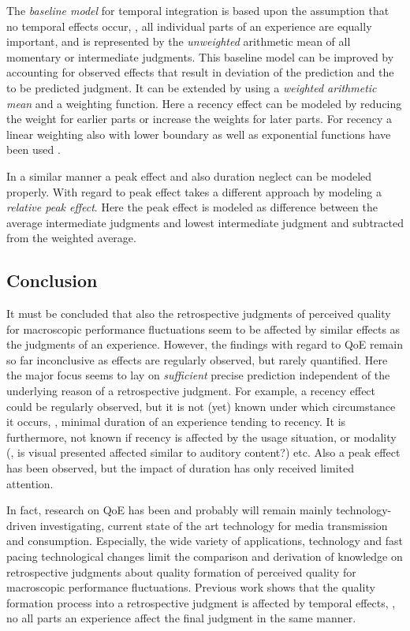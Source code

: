 The \emph{baseline model} for temporal integration is based upon the assumption that no temporal effects occur, \ie, all individual parts of an experience are equally important, and is represented by the \emph{unweighted} arithmetic mean of all momentary or intermediate judgments.
This baseline model can be improved by accounting for observed effects that result in deviation of the prediction and the to be predicted judgment.
It can be extended by using a \emph{weighted arithmetic mean} and a weighting function.
Here a recency effect can be modeled by reducing the weight for earlier parts \citep[\cf,][]{rosenbluth_testing_1998, weiss_modeling_2009, hamberg_time-varying_1999} or increase the weights for later parts.
For recency a linear weighting also with lower boundary \citep[\eg,][]{weiss_modeling_2009} as well as exponential functions have been used \cite[\eg,][]{hamberg_time-varying_1999}.

In a similar manner a peak effect and also duration neglect can be modeled properly.
With regard to 	peak effect \citet{weiss_modeling_2009} takes a different approach by modeling a \emph{relative peak effect}.
Here the peak effect is modeled as difference between the average intermediate judgments and lowest intermediate judgment and subtracted from the weighted average.


\subsection{Conclusion}
It must be concluded that also the retrospective judgments of perceived quality for macroscopic performance fluctuations seem to be affected by similar effects as the judgments of an experience.
However, the findings with regard to \ac{QoE} remain so far inconclusive as effects are regularly observed, but rarely quantified.
Here the major focus seems to lay on \emph{sufficient} precise prediction independent of the underlying reason of a retrospective judgment.
For example, a recency effect could be regularly observed, but it is not (yet) known under which circumstance it occurs, \eg, minimal duration of an experience tending to recency.
It is furthermore, not known if recency is affected by the usage situation, or modality (\eg, is visual presented affected similar to auditory content?) etc.
Also a peak effect has been observed, but the impact of duration has only received limited attention.

In fact, research on \ac{QoE} has been and probably will remain mainly technology-driven investigating, current state of the art technology for media transmission and consumption.
Especially, the wide variety of applications, technology and fast pacing technological changes limit the  comparison and derivation of knowledge on retrospective judgments about quality formation of perceived quality for macroscopic performance fluctuations.
Previous work shows that the quality formation process into a retrospective judgment is affected by temporal effects, \ie, no all parts an experience affect the final judgment in the same manner.